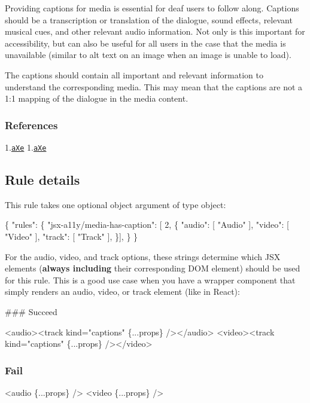 Providing captions for media is essential for deaf users to follow along. Captions should be a transcription or translation of the dialogue, sound effects, relevant musical cues, and other relevant audio information. Not only is this important for accessibility, but can also be useful for all users in the case that the media is unavailable (similar to {\ttfamily alt} text on an image when an image is unable to load).

The captions should contain all important and relevant information to understand the corresponding media. This may mean that the captions are not a 1\+:1 mapping of the dialogue in the media content.

\subsubsection*{References}

1.\href{https://dequeuniversity.com/rules/axe/2.1/audio-caption}{\tt a\+Xe} 1.\href{https://dequeuniversity.com/rules/axe/2.1/video-caption}{\tt a\+Xe}

\subsection*{Rule details}

This rule takes one optional object argument of type object\+:


\begin{DoxyCode}
\{
    "rules": \{
        "jsx-a11y/media-has-caption": [ 2, \{
            "audio": [ "Audio" ],
            "video": [ "Video" ],
            "track": [ "Track" ],
          \}],
    \}
\}
\end{DoxyCode}


For the {\ttfamily audio}, {\ttfamily video}, and {\ttfamily track} options, these strings determine which J\+SX elements ({\bfseries always including} their corresponding D\+OM element) should be used for this rule. This is a good use case when you have a wrapper component that simply renders an {\ttfamily audio}, {\ttfamily video}, or {\ttfamily track} element (like in React)\+:

\#\#\# Succeed 
\begin{DoxyCode}
<audio><track kind="captions" \{...props\} /></audio>
<video><track kind="captions" \{...props\} /></video>
\end{DoxyCode}


\subsubsection*{Fail}


\begin{DoxyCode}
<audio \{...props\} />
<video \{...props\} />
\end{DoxyCode}
 